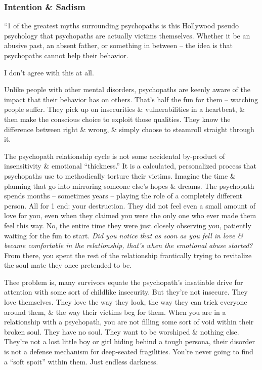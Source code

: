 \documentclass{article}
\numberwithin{equation}{section}
\begin{document}
\subsubsection{Intention \& Sadism}
``1 of the greatest myths surrounding psychopaths is this Hollywood pseudo psychology that psychopaths are actually victims themselves. Whether it be an abusive past, an absent father, or something in between -- the idea is that psychopaths cannot help their behavior.

I don't agree with this at all.

Unlike people with other mental disorders, psychopaths are keenly aware of the impact that their behavior has on others. That's half the fun for them -- watching people suffer. They pick up on insecurities \& vulnerabilities in a heartbeat, \& then make the conscious choice to exploit those qualities. They know the difference between right \& wrong, \& simply choose to steamroll straight through it.

The psychopath relationship cycle is not some accidental by-product of insensitivity \& emotional ``thickness.'' It is a calculated, personalized process that psychopaths use to methodically torture their victims. Imagine the time \& planning that go into mirroring someone else's hopes \& dreams. The psychopath spends months -- sometimes years -- playing the role of a completely different person. All for 1 end: your destruction. They did not feel even a small amount of love for you, even when they claimed you were the only one who ever made them feel this way. No, the entire time they were just closely observing you, patiently waiting for the fun to start. \textit{Did you notice that as soon as you fell in love \& became comfortable in the relationship, that's when the emotional abuse started?} From there, you spent the rest of the relationship frantically trying to revitalize the soul mate they once pretended to be.

Thee problem is, many survivors equate the psychopath's insatiable drive for attention with some sort of childlike insecurity. But they're not insecure. They love themselves. They love the way they look, the way they can trick everyone around them, \& the way their victims beg for them. When you are in a relationship with a psychopath, you are not filling some sort of void within their broken soul. They have no soul. They want to be worshiped \& nothing else. They're not a lost little boy or girl hiding behind a tough persona, their disorder is not a defense mechanism for deep-seated fragilities. You're never going to find a ``soft spoit'' within them. Just endless darkness.
\end{document}
